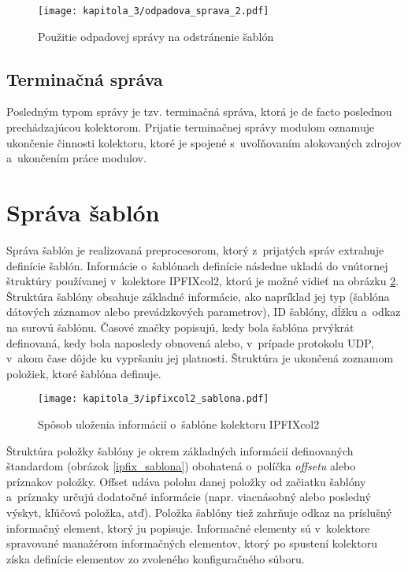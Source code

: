 \begin{figure}[ht]
    \centering
    \texttt{[image: kapitola\_3/odpadova\_sprava\_2.pdf]}
    \caption{Použitie odpadovej správy na odstránenie šablón}
    \label{odpadova_sprava_2}
\end{figure}

\subsection*{Terminačná správa}
Posledným typom správy je tzv. terminačná správa, ktorá je de facto poslednou prechádzajúcou kolektorom. Prijatie terminačnej správy modulom oznamuje ukončenie činnosti kolektoru, ktoré je spojené s~uvoľňovaním alokovaných zdrojov a~ukončením práce modulov.

\section{Správa šablón}
\label{sec:ipfixcol2_sablony}

Správa šablón je realizovaná preprocesorom, ktorý z~prijatých správ extrahuje definície šablón. Informácie o~šablónach definície následne ukladá do vnútornej štruktúry používanej v~kolektore IPFIXcol2, ktorú je možné vidieť na obrázku \ref{ipfixcol2_sablona}. Štruktúra
šablóny obsahuje základné informácie, ako napríklad jej typ (šablóna dátových záznamov alebo prevádzkových parametrov), ID šablóny, dĺžku a~odkaz na surovú šablónu. Časové značky popisujú, kedy bola šablóna prvýkrát definovaná, kedy bola naposledy obnovená alebo, v~prípade
protokolu UDP, v~akom čase dôjde ku vypršaniu jej platnosti. Štruktúra je ukončená zoznamom položiek, ktoré šablóna definuje.

\begin{figure}[ht]
    \centering
    \texttt{[image: kapitola\_3/ipfixcol2\_sablona.pdf]}
    \caption{Spôsob uloženia informácií o~šablóne kolektoru IPFIXcol2}
    \label{ipfixcol2_sablona}
\end{figure}

Štruktúra položky šablóny je okrem základných informácií definovaných štandardom (obrázok \ref{ipfix_sablona}) obohatená o~políčka \textit{offsetu} alebo príznakov položky. Offset udáva polohu danej položky od začiatku šablóny a~príznaky určujú dodatočné informácie
(napr. viacnásobný alebo posledný výskyt, kľúčová položka, atď). Položka šablóny tiež zahrňuje odkaz na príslušný informačný element, ktorý ju popisuje. Informačné elementy sú v~kolektore spravované manažérom informačných elementov, ktorý po spustení kolektoru získa definície elementov
zo zvoleného konfiguračného súboru.

